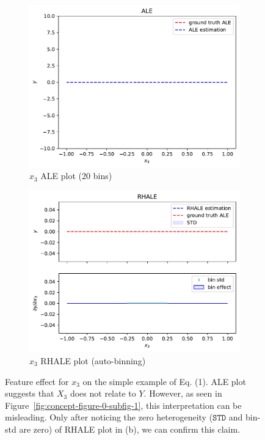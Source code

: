 \documentclass{ecai}  %
\begin{document}
\begin{figure}
  \centering
\begin{subfigure}{.23\textwidth}
  \centering
  \includegraphics[width=1\textwidth]{concept_figure_0/ale_N_100_feat_2_bins_100}
  \caption{\(x_3\) ALE plot (20 bins)}
  \label{fig:concept-figure-1-subfig-0}
\end{subfigure}
\begin{subfigure}{.23\textwidth}
  \centering
  \includegraphics[width=1\textwidth]{concept_figure_0/rhale_N_100_feat_2}
  \caption{\(x_3\) RHALE plot (auto-binning)}
  \label{fig:concept-figure-1-subfig-1}
\end{subfigure}
\caption{Feature effect for \(x_3\) on the simple example of Eq. (1). ALE plot suggests that \(X_3\) does not relate to \(Y\). However, as seen in Figure~\ref{fig:concept-figure-0-subfig-1}, this interpretation can be misleading. Only after noticing the zero heterogeneity (\(\mathtt{STD}\) and bin-std are zero) of RHALE plot in (b), we can confirm this claim.}
  \label{fig:ale-with-heter}
\end{figure}
\end{document}
